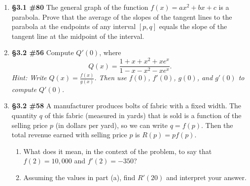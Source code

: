 \documentclass[%
]{article}
\begin{document}
\begin{enumerate}
\item {\bf \S3.1 \#80} The general graph of the function $f(x)=ax^2+bx+c$ is a parabola.  Prove that the average of the slopes of the tangent lines to the parabola at the endpoints of any interval $[p,q]$ equals the slope of the tangent line at the midpoint of the interval.

\item {\bf \S3.2 \#56} Compute $Q'(0)$, where
\[
Q(x)=\frac{1+x+x^2+xe^x}{1-x-x^2-xe^x}.
\]
\textit{Hint: Write $\displaystyle Q(x)=\frac{f(x)}{g(x)}$.  Then use $f(0)$, $f'(0)$, $g(0)$, and $g'(0)$ to compute $Q'(0)$.}

\item {\bf \S3.2 \#58} A manufacturer produces bolts of fabric with a fixed width.  The quantity $q$ of this fabric (measured in yards) that is sold is a function of the selling price $p$ (in dollars per yard), so we can write $q=f(p)$.  Then the total revenue earned with selling price $p$ is $R(p)=pf(p)$.
	\begin{enumerate}
	\item What does it mean, in the context of the problem, to say that $f(2)=10,000$ and $f'(2)=-350$?
	\item Assuming the values in part (a), find $R'(20)$ and interpret your answer.
	\end{enumerate}

	
\end{enumerate}
\end{document}
